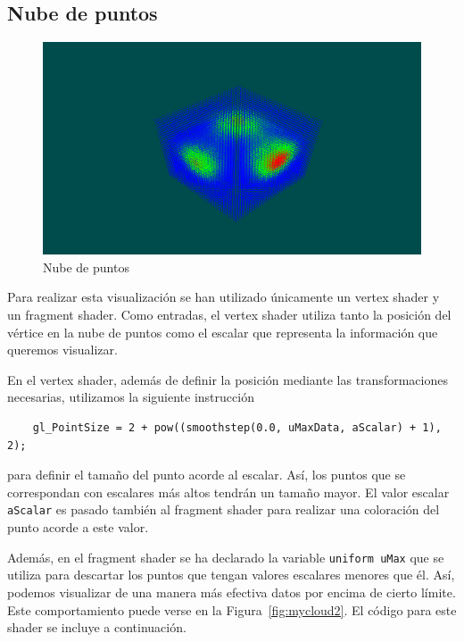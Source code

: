 \subsection{Nube de puntos}
\label{makereference5.5.5}

\begin{figure}[ht]
	\centering	
	\includegraphics[width=\textwidth]{figures/mycloud.png}
	\caption{Nube de puntos}
	\label{fig:mycloud}
\end{figure}

Para realizar esta visualización se han utilizado únicamente un vertex shader y
un fragment shader. Como entradas, el vertex shader utiliza tanto la posición
del vértice en la nube de puntos como el escalar que representa la información
que queremos visualizar. 

En el vertex shader, además de definir la posición mediante las transformaciones
necesarias, utilizamos la siguiente instrucción

\begin{verbatim}
    gl_PointSize = 2 + pow((smoothstep(0.0, uMaxData, aScalar) + 1), 2);
\end{verbatim}
para definir el tamaño del punto acorde al escalar. Así, los puntos que se
correspondan con escalares más altos tendrán un tamaño mayor. El valor escalar
\verb|aScalar| es pasado también al fragment shader para realizar una coloración
del punto acorde a este valor. 

Además, en el fragment shader se ha declarado la variable \verb|uniform uMax|
que se utiliza para descartar los puntos que tengan valores escalares menores
que él. Así, podemos visualizar de una manera  más efectiva datos por encima de
cierto límite. Este comportamiento puede verse en la Figura~\ref{fig:mycloud2}.
El código para este shader se incluye a continuación.

